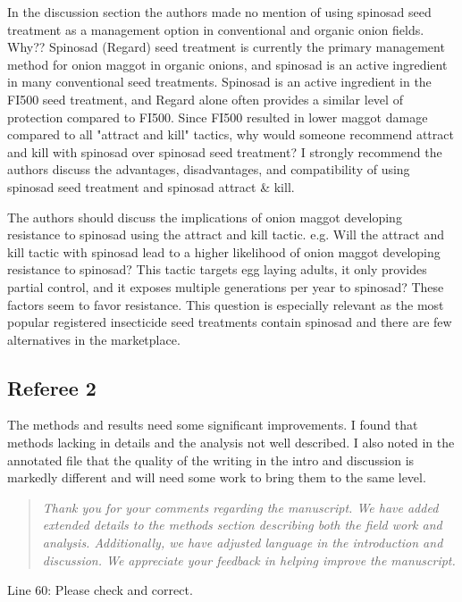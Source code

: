 \documentclass{article}
\begin{document}
In the discussion section the authors made no mention of using spinosad seed treatment as a management option in conventional and organic onion fields.  Why?? Spinosad (Regard) seed treatment is currently the primary management method for onion maggot in organic onions, and spinosad is an active ingredient in many conventional seed treatments.   Spinosad is an active ingredient in the FI500 seed treatment, and Regard alone often provides a similar level of protection compared to FI500.  Since FI500 resulted in lower maggot damage compared to all "attract and kill" tactics, why would someone recommend attract and kill with spinosad over spinosad seed treatment?   I strongly recommend the authors discuss the advantages, disadvantages, and compatibility of using spinosad seed treatment and spinosad attract & kill.    




The authors should discuss the implications of onion maggot developing resistance to spinosad using the attract and kill tactic.  e.g. Will the attract and kill tactic with spinosad lead to a higher likelihood of onion maggot developing resistance to spinosad?  This tactic targets egg laying adults, it only provides partial control, and it exposes multiple generations per year to spinosad?   These factors seem to favor resistance. This question is especially relevant as the most popular registered insecticide seed treatments contain spinosad and there are few alternatives in the marketplace.     

\subsection*{Referee 2}

The methods and results need some significant improvements. I found that methods lacking in details and the analysis not well described. I also noted in the annotated file that the quality of the writing in the intro and discussion is markedly different and will need some work to bring them to the same level.

\begin{quote}
    \textit{Thank you for your comments regarding the manuscript.  We have added extended details to the methods section describing both the field work and analysis.  Additionally, we have adjusted language in the introduction and discussion.  We appreciate your feedback in helping improve the manuscript.  }
\end{quote}

Line 60: Please check and correct.  
\end{document}
